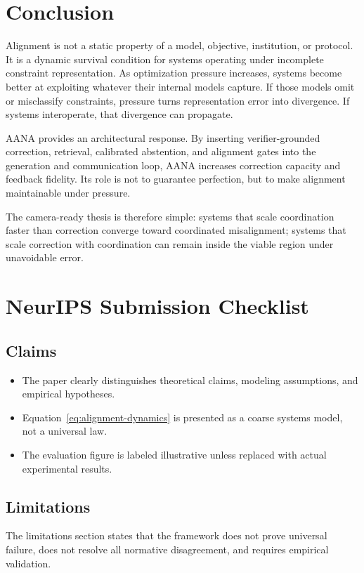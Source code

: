 \documentclass[11pt]{article}
\begin{document}
\section{Conclusion}

Alignment is not a static property of a model, objective, institution, or protocol. It is a dynamic survival condition for systems operating under incomplete constraint representation. As optimization pressure increases, systems become better at exploiting whatever their internal models capture. If those models omit or misclassify constraints, pressure turns representation error into divergence. If systems interoperate, that divergence can propagate.

AANA provides an architectural response. By inserting verifier-grounded correction, retrieval, calibrated abstention, and alignment gates into the generation and communication loop, AANA increases correction capacity and feedback fidelity. Its role is not to guarantee perfection, but to make alignment maintainable under pressure.

The camera-ready thesis is therefore simple: systems that scale coordination faster than correction converge toward coordinated misalignment; systems that scale correction with coordination can remain inside the viable region under unavoidable error.

\appendix
\section{NeurIPS Submission Checklist}

\subsection*{Claims}
\begin{itemize}
\item The paper clearly distinguishes theoretical claims, modeling assumptions, and empirical hypotheses.
\item Equation~\ref{eq:alignment-dynamics} is presented as a coarse systems model, not a universal law.
\item The evaluation figure is labeled illustrative unless replaced with actual experimental results.
\end{itemize}

\subsection*{Limitations}
The limitations section states that the framework does not prove universal failure, does not resolve all normative disagreement, and requires empirical validation.
\end{document}
